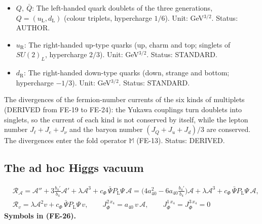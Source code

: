 \documentclass[
  10pt,
]{article}
\begin{document}
\begin{itemize}
  Status: STANDARD.
\item
  \(Q,\ \bar Q\): The left-handed quark doublets of the three
  generations, \(Q = (u_{\mathrm{L}}, d_{\mathrm{L}})\) (colour
  triplets, hypercharge \(1/6\)). Unit: GeV\(^{3/2}\). Status: AUTHOR.
\item
  \(u_{\mathrm{R}}\): The right-handed up-type quarks (up, charm and
  top; singlets of \(SU(2)_L\), hypercharge \(2/3\)). Unit:
  GeV\(^{3/2}\). Status: STANDARD.
\item
  \(d_{\mathrm{R}}\): The right-handed down-type quarks (down, strange
  and bottom; hypercharge \(-1/3\)). Unit: GeV\(^{3/2}\). Status:
  STANDARD.
\end{itemize}

The divergences of the fermion-number currents of the six kinds of
multiplets (DERIVED from FE-19 to FE-24): the Yukawa couplings turn
doublets into singlets, so the current of each kind is not conserved by
itself, while the lepton number \(J_\ell + J_e + J_\nu\) and the baryon
number \((J_Q + J_u + J_d)/3\) are conserved. The divergences enter the
fold operator \(\mathbb{M}\) (FE-13). Status: DERIVED.

\hypertarget{the-ad-hoc-higgs-vacuum}{%
\subsection{The ad hoc Higgs vacuum}\label{the-ad-hoc-higgs-vacuum}}

\[
\begin{aligned}
&\mathcal{R}_{\mathcal{A}} = \mathcal{A}'' + 3\frac{b_4'}{b_4}\mathcal{A}' + \lambda\mathcal{A}^3 + c_\Phi\,\bar\Psi P_{\mathrm{L}}\Psi\,\mathcal{A}
 = \Big(4a_{40}^2 - 6a_{40}\frac{b_4'}{b_4}\Big)\mathcal{A} + \lambda\mathcal{A}^3 + c_\Phi\,\bar\Psi P_{\mathrm{L}}\Psi\,\mathcal{A},\\
&\mathcal{R}_v = \lambda\mathcal{A}^2v + c_\Phi\,\bar\Psi P_{\mathrm{L}}\Psi\,v,\qquad
 J_\Phi^{2\,x_4} = a_{40}\,v\,\mathcal{A},\qquad J_\Phi^{1\,x_4} = J_\Phi^{3\,x_4} = 0
\end{aligned} \tag{FE-26}
\] \textbf{Symbols in (FE-26).}
\end{document}
